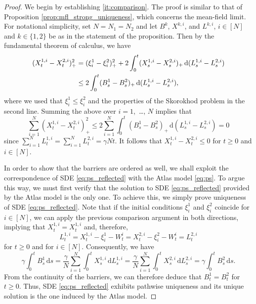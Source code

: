 \documentclass[10pt,a4paper]{amsart}
\renewcommand{\d}{\mathrm{d}}
\begin{document}
\begin{proof}
We begin by establishing \ref{it:comparison}. The proof is similar to that of Proposition \ref{prop:mfl_strong_uniqueness}, which concerns the mean-field limit. For notational simplicity, set $N = N_1 = N_2$ and let $B^k$, $X^{k, i}$, and $L^{k, i}$, $i \in [N]$ and $k \in \{1, 2\}$ be as in the statement of the proposition. Then by the fundamental theorem of calculus, we have
\begin{align} \label{eq:pos_part}
    (X^{1, i}_t - X^{2, i}_t)_+^2 &= (\xi^1_i - \xi^2_i)_+^2 + 2\int_0^t (X^{1, i}_s - X^{2, i}_s)_+ \, \d (L^{1, i}_s - L^{2, i}_s) \notag \\
    &\leq 2\int_0^t (B^1_s - B^2_s)_+ \, \d (L^{1, i}_s - L^{2, i}_s),
\end{align}
where we used that $\xi^1_i \leq \xi^2_i$ and the properties of the Skorokhod problem in the second line. Summing the above over $i = 1$,~\ldots, $N$ implies that
\begin{equation}
    \sum_{i = 1}^N (X^{1, i}_t - X^{2, i}_t)_+^2 \leq 2\sum_{i = 1}^N \int_0^t (B^1_s - B^2_s)_+ \, \d (L^{1, i}_s - L^{2, i}_s) = 0
\end{equation}
since $\sum_{i = 1}^N L^{1, i}_t = \sum_{i = 1}^N L^{2, i}_t = \gamma N t$. It follows that $X^{1, i}_t - X^{2, i}_t \leq 0$ for $t \geq 0$ and $i \in [N]$. 

In order to show that the barriers are ordered as well, we shall exploit the correspondence of SDE \eqref{eq:ps_reflected} with the Atlas model \eqref{eq:ps}. To argue this way, we must first verify that the solution to SDE \eqref{eq:ps_reflected} provided by the Atlas model is the only one. To achieve this, we simply prove uniqueness of SDE \eqref{eq:ps_reflected}. Note that if the initial conditions $\xi^1_i$ and $\xi^2_i$ coincide for $i \in [N]$, we can apply the previous comparison argument in both directions, implying that $X^{1, i}_t = X^{1, i}_t$ and, therefore,
\begin{equation*}
    L^{1, i}_t = X^{1, i}_t - \xi^1_i - W^i_t = X^{2, i}_t - \xi^2_i - W^i_t = L^{2, i}_t
\end{equation*}
for $t \geq 0$ and for $i \in [N]$. Consequently, we have
\begin{equation*}
    \gamma \int_0^t B^1_s \, \d s = \frac{\gamma}{N} \sum_{i = 1}^N \int_0^t X^{1, i}_s \, \d L^{1, i}_s = \frac{\gamma}{N} \sum_{i = 1}^N \int_0^t X^{2, i}_s \, \d L^{2, i}_s = \gamma \int_0^t B^2_s \, \d s.
\end{equation*}
From the continuity of the barriers, we can therefore deduce that $B^1_t = B^2_t$ for $t \geq 0$. Thus, SDE \eqref{eq:ps_reflected} exhibits pathwise uniqueness and its unique solution is the one induced by the Atlas model.


\end{proof}
\end{document}
